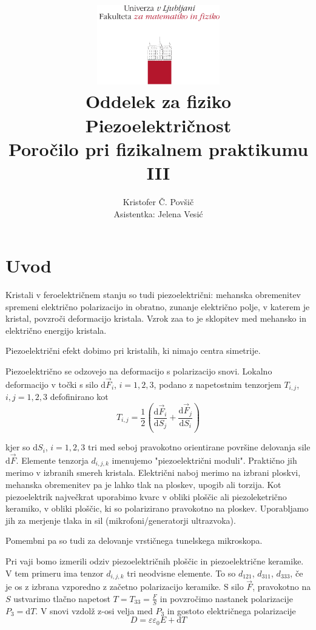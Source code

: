 \documentclass[12pt]{report}
\title{
  \includegraphics[width=0.4\textwidth]{fmf_logo}\\
  {\small Oddelek za fiziko} \\
  {Piezoelektričnost}\\
  {\small Poročilo pri fizikalnem praktikumu III}\\

}
\date{}
\author{ Kristofer Č. Povšič \\[5 cm]
 \small  Asistentka: Jelena Vesić
}
\begin{document}
\setcounter{page}{2}

\maketitle

\chapter*{Uvod}

Kristali v feroelektričnem stanju so tudi piezoelektrični: mehanska obremenitev spremeni električno polarizacijo in obratno, zunanje električno polje, v katerem je kristal, povzroči deformacijo kristala. Vzrok zaa to je sklopitev med mehansko in električno energijo kristala. 

Piezoelektrični efekt dobimo pri kristalih, ki nimajo centra simetrije. 

Piezoelektrično se odzovejo na deformacijo s polarizacijo snovi. Lokalno deformacijo v točki s silo $\text{d}\vec{F}_i$, $i = 1, 2, 3$, podano z napetostnim tenzorjem $T_{i,j}$, $i,j = 1,2,3$ defofinirano kot
\begin{equation}
  T_{i,j} = \frac{1}{2}\left(\frac{\text{d}\vec{F}_i}{\text{d}S_j} + \frac{\text{d}\vec{F}_j}{\text{d}S_i}\right)
\end{equation}

kjer so $\text{d}S_i$, $i=1,2,3$ tri med seboj pravokotno orientirane površine delovanja sile $\text{d}\vec{F}$. Elemente tenzorja $d_{i,j,k}$ imenujemo "piezoelektrični moduli". Praktično jih merimo v izbranih smereh kristala. Električni naboj merimo na izbrani ploskvi, mehanska obremenitev pa je lahko tlak na ploskev, upogib ali torzija. Kot piezoelektrik največkrat uporabimo kvarc v obliki ploščic ali piezoleketrično keramiko, v obliki ploščic, ki so polarizirano pravokotno na ploskev. Uporabljamo jih za merjenje tlaka in sil (mikrofoni/generatorji ultrazvoka). 

Pomembni pa so tudi za delovanje vrstičnega tunelskega mikroskopa. 

Pri vaji bomo izmerili odziv piezoelektričnih ploščic in piezoelektrične keramike. V tem primeru ima tenzor $d_{i,j,k}$ tri neodvisne elemente. To so $d_{121}$, $d_{311}$, $d_{333}$, če je os z izbrana vzporedno z začetno polarizacijo keramike. S silo $\vec{F}$, pravokotno na $S$ ustvarimo tlačno napetost $T=T_{33} = \frac{F}{S}$ in povzročimo nastanek polarizacije $P_3 = \text{d}T$. V snovi vzdolž z-osi velja med $P_3$ in gostoto električnega polarizacije
\begin{equation}
  D = \varepsilon \varepsilon_0 E + \text{d}T
\end{equation}
\end{document}
